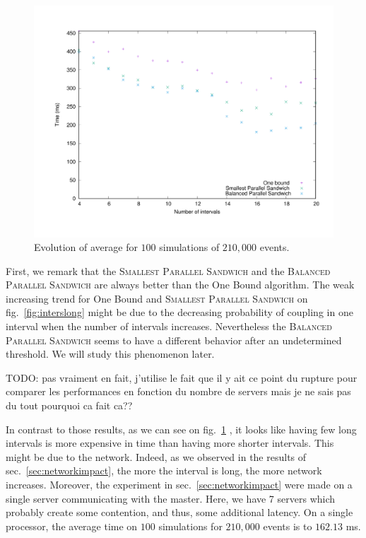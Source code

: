 \documentclass[a4paper,10pt]{article}
\newcommand{\todo}[1]{{\color{red} TODO: {#1}}}
\begin{document}
\begin{figure}[H]
\centering
\label{fig:timelong}
 \includegraphics[scale=0.45]{timelong.pdf}
 \caption{Evolution of average for $100$ simulations of $210,000$ events.}
\end{figure}


First, we remark that the \textsc{Smallest Parallel Sandwich}  and the \textsc{Balanced Parallel Sandwich} are always better than the One Bound algorithm. The weak increasing trend for One Bound and \textsc{Smallest Parallel Sandwich} on fig.~\ref{fig:interslong} might be due to the decreasing probability of coupling in one interval when the number of intervals increases. Nevertheless the \textsc{Balanced Parallel Sandwich} seems to have a different behavior after an undetermined threshold. We will study this phenomenon later.

\todo{pas vraiment en fait, j'utilise le fait que il y ait ce point du rupture pour comparer les performances en fonction du nombre de servers mais je ne sais pas du tout pourquoi ca fait ca??}

In contrast to those results, as we can see on fig.~\ref{fig:timelong} , it looks like having few long intervals is more expensive in time than having more shorter intervals. This might be due to the network. Indeed, as we observed in the results of sec.~\ref{sec:networkimpact}, the more the interval is long, the more network increases. Moreover, the experiment in sec.~\ref{sec:networkimpact} were made on a single server communicating with the master. Here, we have 7 servers which probably create some contention, and thus, some additional latency.
On a single processor, the average time on $100$ simulations for $210,000$ events is to $162.13$ ms.
\end{document}

